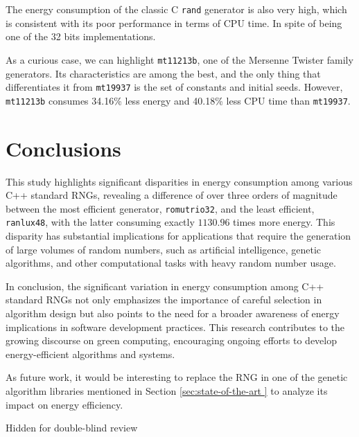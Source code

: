 \documentclass[dvipsnames,format=sigconf,anonymous=true,review=true]{acmart}
\begin{document}
The energy consumption of the classic C \texttt{rand} generator is also very high, which is consistent with its poor performance in terms of CPU time. In spite of being one of the 32 bits implementations.

As a curious case, we can highlight \texttt{mt11213b}, one of the Mersenne Twister family generators. Its characteristics are among the best, and the only thing that differentiates it from \texttt{mt19937} is the set of constants and initial seeds. However, \texttt{mt11213b} consumes 34.16\% less energy and 40.18\% less CPU time than \texttt{mt19937}.

\section{Conclusions}
\label{sec:conclusions}

This study highlights significant disparities in energy consumption among various C++ standard RNGs, revealing a difference of over three orders of magnitude between the most efficient generator, \texttt{romutrio32}, and the least efficient, \texttt{ranlux48}, with the latter consuming exactly $1130.96$ times more energy. This disparity has substantial implications for applications that require the generation of large volumes of random numbers, such as artificial intelligence, genetic algorithms, and other computational tasks with heavy random number usage.

In conclusion, the significant variation in energy consumption among C++ standard RNGs not only emphasizes the importance of careful selection in algorithm design but also points to the need for a broader awareness of energy implications in software development practices. This research contributes to the growing discourse on green computing, encouraging ongoing efforts to develop energy-efficient algorithms and systems.

As future work, it would be interesting to replace the RNG in one of the genetic algorithm libraries mentioned in Section \ref{sec:state-of-the-art } to analyze its impact on energy efficiency.

\begin{acks}
Hidden for double-blind review
\end{acks}



\end{document}

